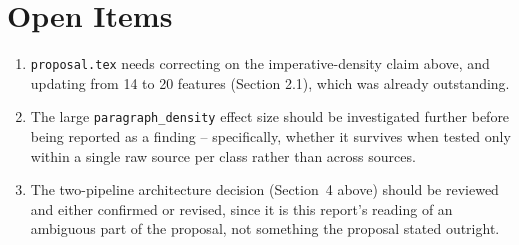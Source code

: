 \documentclass[11pt]{article}
\begin{document}
\section{Open Items}
\begin{enumerate}
\item \texttt{proposal.tex} needs correcting on the imperative-density claim above, and updating from
14 to 20 features (Section 2.1), which was already outstanding.
\item The large \texttt{paragraph\_density} effect size should be investigated further before being
reported as a finding -- specifically, whether it survives when tested only within a single raw source
per class rather than across sources.
\item The two-pipeline architecture decision (Section~4 above) should be reviewed and either confirmed
or revised, since it is this report's reading of an ambiguous part of the proposal, not something the
proposal stated outright.
\end{enumerate}
\end{document}
